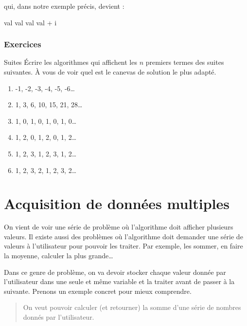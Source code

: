 		qui, dans notre exemple précis, devient :

		\begin{LDA}
				\Let val 
					\Write val
					\Let val \Gets val + i
				\EndFor
			\EndAlgo
		\end{LDA}

	\subsubsection{Exercices}
		
		\begin{Exercice}{Suites}
			Écrire les algorithmes qui affichent
			les $n$ premiers termes des suites suivantes.
			À vous de voir quel est le canevas de solution
			le plus adapté.
			\begin{enumerate}[label=\alph*)]
			\item -1, -2, -3, -4, -5, -6\dots
			\item 1, 3, 6, 10, 15, 21, 28\dots
			\item 1, 0, 1, 0, 1, 0, 1, 0\dots
			\item 1, 2, 0, 1, 2, 0, 1, 2\dots
			\item 1, 2, 3, 1, 2, 3, 1, 2\dots
			\item 1, 2, 3, 2, 1, 2, 3, 2\dots
			\end{enumerate}			
		\end{Exercice}
		
\section{Acquisition de données multiples}

	On vient de voir une série de problème
	où l'algorithme doit afficher plusieurs valeurs.
	Il existe aussi des problèmes
	où l'algorithme doit demander une série de valeurs
	à l'utilisateur pour pouvoir les traiter.
	Par exemple, les sommer, en faire la moyenne,
	calculer la plus grande\dots
	
	Dans ce genre de problème,
	on va devoir stocker chaque valeur donnée par l'utilisateur 
	dans une seule et même variable et la traiter avant de passer
	à la suivante.
	Prenons un exemple concret pour mieux comprendre.

	\begin{quote}
	On veut pouvoir calculer (et retourner)
	la somme d’une série de nombres donnés par l’utilisateur. 
	\end{quote}

